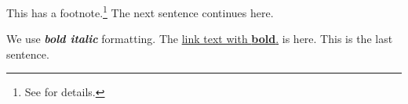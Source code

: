 This has a footnote.\footnote{See \citet{smith2024} for details.} The next sentence continues here.

We use \textbf{\textit{bold italic}} formatting. The \href{http://example.com}{link text with \textbf{bold}.} is here. This is the last sentence.
